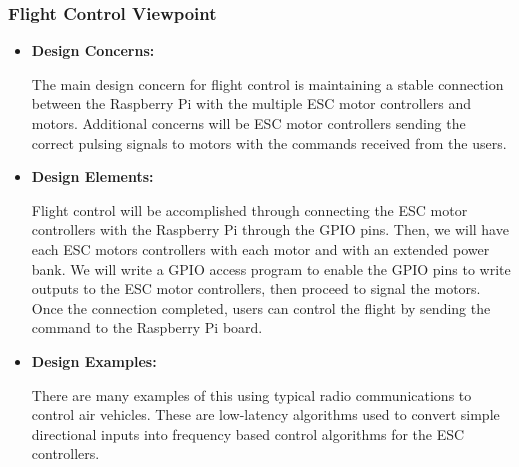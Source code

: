 \documentclass[onecolumn, draftclsnofoot,10pt, compsoc]{IEEEtran}
\begin{document}
\subsubsection{Flight Control Viewpoint} %
\begin{itemize}
\item{ \textbf{Design Concerns:}}

The main design concern for flight control is maintaining a stable connection between the Raspberry Pi with the multiple ESC motor controllers and motors. Additional concerns will be ESC motor controllers sending the correct pulsing signals to motors with the commands received from the users. \\
\item{ \textbf{Design Elements:}}

Flight control will be accomplished through connecting the ESC motor controllers with the Raspberry Pi through the GPIO pins\cite{r14}. Then, we will have each ESC motors controllers with each motor and with an extended power bank. We will write a GPIO access program to enable the GPIO pins to write outputs to the ESC motor controllers, then proceed to signal the motors. Once the connection completed, users can control the flight by sending the command to the Raspberry Pi board.\\

\item{ \textbf{Design Examples:}} %

There are many examples of this using typical radio communications to control air vehicles. These are low-latency algorithms used to convert simple directional inputs into frequency based control algorithms for the ESC controllers. \\

\end{itemize}
\end{document}
